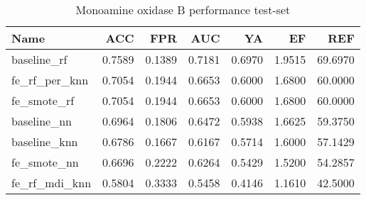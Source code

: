 \begin{table}[H]
    \begin{center}
        \caption{Monoamine oxidase B performance test-set}
        \begin{tabular}{lrrrrrr}
            \toprule
            Name             & ACC    & FPR    & AUC    & YA     & EF     & REF     \\
            \midrule
            baseline\_rf     & 0.7589 & 0.1389 & 0.7181 & 0.6970 & 1.9515 & 69.6970 \\
            fe\_rf\_per\_knn & 0.7054 & 0.1944 & 0.6653 & 0.6000 & 1.6800 & 60.0000 \\
            fe\_smote\_rf    & 0.7054 & 0.1944 & 0.6653 & 0.6000 & 1.6800 & 60.0000 \\
            baseline\_nn     & 0.6964 & 0.1806 & 0.6472 & 0.5938 & 1.6625 & 59.3750 \\
            baseline\_knn    & 0.6786 & 0.1667 & 0.6167 & 0.5714 & 1.6000 & 57.1429 \\
            fe\_smote\_nn    & 0.6696 & 0.2222 & 0.6264 & 0.5429 & 1.5200 & 54.2857 \\
            fe\_rf\_mdi\_knn & 0.5804 & 0.3333 & 0.5458 & 0.4146 & 1.1610 & 42.5000 \\
            \bottomrule
        \end{tabular}
    \end{center}
\end{table}

